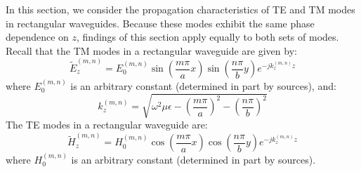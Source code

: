 

\label{m0224_Rectangular_Waveguide_Prop} %

In this section, we consider the propagation characteristics of TE and TM modes in rectangular waveguides.
Because these modes exhibit the same phase dependence on $z$, findings of this section apply equally to both sets of modes.
Recall that the TM modes in a rectangular waveguide are given by:
\begin{equation}
\widetilde{E}_z^{(m,n)} = E_0^{(m,n)} \sin\left(\frac{m\pi}{a} x\right) \sin\left(\frac{n\pi}{b} y\right) e^{-jk_z^{(m,n)} z} \label{m0224_eEz}
\end{equation}
%
where 
$E_0^{(m,n)}$ is an arbitrary constant (determined in part by sources), 
and:
% 
\begin{equation}
k_z^{(m,n)} = \sqrt{ \omega^2\mu\epsilon - \left(\frac{m\pi}{a}\right)^2 - \left(\frac{n\pi}{b}\right)^2   } \label{m0224_ekzm}
\end{equation}
%
The TE modes in a rectangular waveguide are:
\begin{equation}
\widetilde{H}_z^{(m,n)} = H_0^{(m,n)} \cos\left(\frac{m\pi}{a} x\right) \cos\left(\frac{n\pi}{b} y\right) e^{-jk_z^{(m,n)} z} \label{m0224_eHz}
\end{equation}
%
where 
$H_0^{(m,n)}$ is an arbitrary constant (determined in part by sources).

